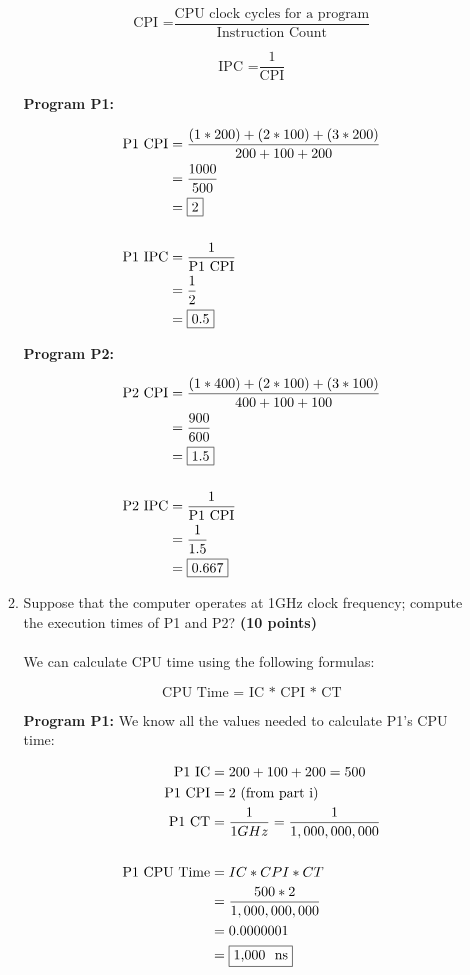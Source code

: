 \documentclass[a4paper, 15pt]{exam}
\begin{document}
\begin{enumerate}
\begin{enumerate}
$$\text{CPI =}\frac{\text{CPU clock cycles for a program}}{\text{Instruction Count}}$$

$$\text{IPC =}\frac{1}{\text{CPI}}$$

\textbf{Program P1:} 

\begin{align*} 
   			\text{P1 CPI} &= \frac{(1 * 200) + (2 * 100) + (3 * 200)}{200 + 100 + 200} \\
   			&= \frac{1000}{500} \\
   			&= \fbox{2} \\ \\
   			\text{P1 IPC} &= \frac{1}{\text{P1 CPI}} \\
   			&= \frac{1}{2} \\
   			&= \fbox{0.5}
   	\end{align*}
   	
   	\textbf{Program P2:} 

\begin{align*} 
   			\text{P2 CPI} &= \frac{(1 * 400) + (2 * 100) + (3 * 100)}{400 + 100 + 100} \\
   			&= \frac{900}{600} \\
   			&= \fbox{1.5} \\ \\
   			\text{P2 IPC} &= \frac{1}{\text{P1 CPI}} \\
   			&= \frac{1}{1.5} \\
   			&= \fbox{0.667}
   	\end{align*}
   	
\item Suppose that the computer operates at 1GHz clock frequency; compute the execution times of P1 and P2? 
 \textbf {(10 points)} \\ \\
We can calculate CPU time using the following formulas:

$$\text{CPU Time = IC * CPI * CT}$$

\textbf{Program P1:} We know all the values needed to calculate P1's CPU time:

\begin{align*} 
   			\text{P1 IC} &= 200 + 100 + 200 = 500 \\
   			\text{P1 CPI} &= 2 \text{ (from part i)} \\
   			\text{P1 CT} &= \frac{1}{1 GHz} = \frac{1}{1,000,000,000} \\ \\
   			\text{P1 CPU Time} &= IC * CPI * CT \\
   			&= \frac{500 * 2}{1,000,000,000} \\
   			&= 0.0000001 \\
   			&= \fbox{1,000 \ ns}
   	\end{align*}


\end{enumerate}
\end{enumerate}
\end{document}
